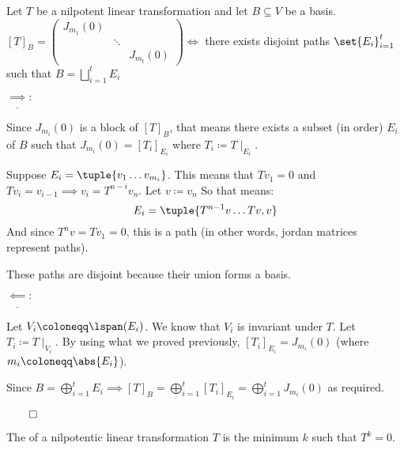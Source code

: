 \documentclass[10pt]{article}
\begin{document}
\begin{lemma}[nilJordFormLemma]{Let $T$ be a nilpotent linear transformation and let $B\subseteq V$ be a basis. $[T]_B = \begin{pmatrix} J_{m_1}(0) & & \\ & \ddots & \\ & & J_{m_t}(0) \end{pmatrix} \iff$ there exists disjoint paths $\set{E_i}_{i=1}^t$ such that $B=\displaystyle\bigsqcup_{i=1}^t E_i$}

$\underline{\implies}:$ \begin{minipage}[t]{\dimexpr\textwidth-2cm}

Since $J_{m_i}(0)$ is a block of $[T]_B$, that means there exists a subset (in order) $E_i$ of $B$ such that $J_{m_i}(0)=[T_i]_{E_i}$ where $T_i\coloneqq T\mid_{E_i}$.

Suppose $E_i=\tuple{v_1\dots v_{m_i}}$. This means that $Tv_1=0$ and $Tv_i=v_{i-1}\implies v_i=T^{n-i}v_n$. Let $v\coloneqq v_n$ So that means:
\[ E_i = \tuple{T^{n-1}v\dots Tv, v} \]
And since $T^nv=Tv_1=0$, this is a path (in other words, jordan matrices represent paths).

These paths are disjoint because their union forms a basis.

\end{minipage}

$\underline{\impliedby}:$ \begin{minipage}[t]{\dimexpr\textwidth-2cm}

Let $V_i\coloneqq\lspan(E_i)$. We know that $V_i$ is invariant under $T$. Let $T_i\coloneqq T\mid_{V_i}$. By using what we proved previously, $[T_i]_{E_i}=J_{m_i}(0)$ (where $m_i\coloneqq\abs{E_i}$).

Since $B=\displaystyle\bigoplus_{i=1}^t E_i \implies [T]_B=\bigoplus_{i=1}^t [T_i]_{E_i} = \bigoplus_{i=1}^t J_{m_i}(0)$ as required.

\end{minipage}

$\qed$

\end{lemma}

\begin{definition}

The  of a nilpotentic linear transformation $T$ is the minimum $k$ such that $T^k=0$.

\end{definition}
\end{document}
